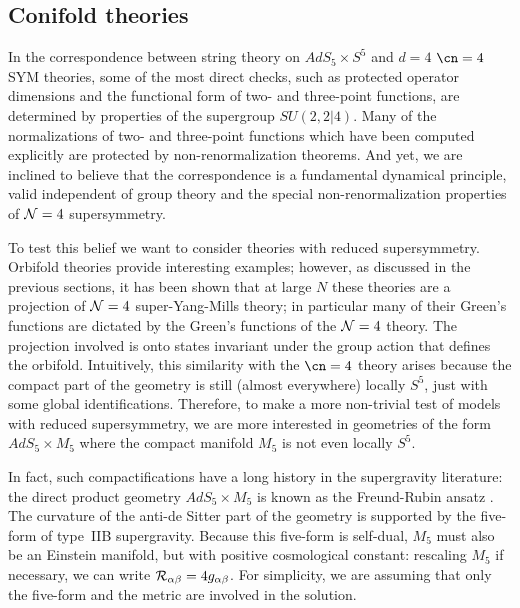 \subsection{Conifold theories}
\label{conifolds}

In the correspondence between string theory on $AdS_5 \times S^5$ and
$d=4$ $\cn=4$ SYM theories, some of the most direct checks, such as
protected operator dimensions and the functional form of two- and
three-point functions, are determined by properties of the supergroup
$SU(2,2|4)$.  Many of the normalizations of two- and three-point
functions which have been computed explicitly are protected by
non-renormalization theorems.  And yet, we are inclined to believe that
the correspondence is a fundamental dynamical principle, valid
independent of group theory and the special non-renormalization
properties of ${\cal N}=4$ supersymmetry.

To test this belief we want to consider theories with reduced
supersymmetry.  Orbifold theories \cite{Kachru:1998ys} provide 
interesting examples;
however, as discussed in the previous sections,
it has been shown \cite{Bershadsky:1998mb,Bershadsky:1998cb} that
at large $N$ these theories are a projection of ${\cal N}=4$
super-Yang-Mills theory; in particular many of
their Green's functions are dictated
by the Green's functions of the ${\cal N}=4$ theory.  
The projection involved is onto
states invariant under the group action that defines the orbifold.
Intuitively,
this similarity with the $\cn=4$ theory arises because
the compact part of the geometry is
still (almost everywhere)
locally $S^5$, just with some global identifications. Therefore, 
to make a more
non-trivial test of models with reduced supersymmetry, we are
more interested in geometries of the form $AdS_5 \times M_5$ where the
compact manifold $M_5$ is not even locally $S^5$.

In fact, such compactifications have a long history in the
supergravity literature: the direct product geometry $AdS_5 \times
M_5$ is known as the Freund-Rubin ansatz \cite{Freund:1980xh}.
The curvature of the anti-de Sitter part of the geometry is supported
by the five-form of type~IIB supergravity.  Because this five-form is
self-dual, $M_5$ must also be an Einstein manifold, but with positive
cosmological constant: rescaling $M_5$ if necessary, we can write
${\cal R}_{\alpha\beta} = 4 g_{\alpha\beta}$.  For simplicity,
we are assuming that only the
five-form and the metric are involved in the solution.

